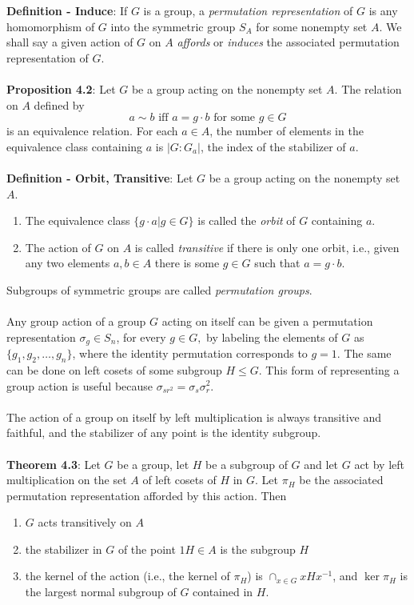 \documentclass{article}
\begin{document}
\textbf{Definition - Induce}: If $G$ is a group, a \textit{permutation representation} of $G$ is any homomorphism of $G$ into the symmetric group $S_A$ for some nonempty set $A$. We shall say a given action of $G$ on $A$ \textit{affords} or \textit{induces} the associated permutation representation of $G$. \\ \\
\textbf{Proposition 4.2}: Let $G$ be a group acting on the nonempty set $A$. The relation on $A$ defined by $$a \sim b \text{ iff } a = g \cdot b \text{ for some } g \in G$$ is an equivalence relation. For each $a \in A$, the number of elements in the equivalence class containing $a$ is $|G : G_a|$, the index of the stabilizer of $a$. \\ \\
\textbf{Definition - Orbit, Transitive}: Let $G$ be a group acting on the nonempty set $A$. \begin{enumerate}
    \item The equivalence class $\{g \cdot a | g \in G\}$ is called the \textit{orbit} of $G$ containing $a$.
    \item The action of $G$ on $A$ is called \textit{transitive} if there is only one orbit, i.e., given any two elements $a, b \in A$ there is some $g \in G$ such that $a = g \cdot b$.
\end{enumerate} $ $ \\
Subgroups of symmetric groups are called \textit{permutation groups}. \\ \\
Any group action of a group $G$ acting on itself can be given a permutation representation $\sigma_g \in S_n$, for every $g \in G,$ by labeling the elements of $G$ as $\{g_1, g_2, \dots, g_n\}$, where the identity permutation corresponds to $g = 1$. The same can be done on left cosets of some subgroup $H \leq G$. This form of representing a group action is useful because $\sigma_{sr^2} = \sigma_s \sigma_r^2$. \\ \\
The action of a group on itself by left multiplication is always transitive and faithful, and the stabilizer of any point is the identity subgroup. \\ \\
\textbf{Theorem 4.3}:  Let $G$ be a group, let $H$ be a subgroup of $G$ and let $G$ act by left multiplication on the set $A$ of left cosets of $H$ in $G$. Let $\pi_H$ be the associated permutation representation afforded by this action. Then \begin{enumerate}
    \item $G$ acts transitively on $A$
    \item the stabilizer in $G$ of the point $1H \in A$ is the subgroup $H$
    \item  the kernel of the action (i.e., the kernel of $\pi_H$) is $\cap_{x \in G} xHx^{-1}$, and $\ker{\pi_H}$ is the largest normal subgroup of $G$ contained in $H$.
\end{enumerate} $ $ \\
\end{document}
